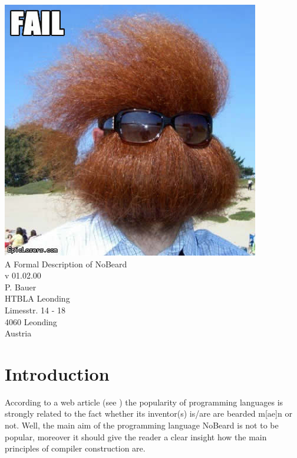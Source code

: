 \documentclass[11pt]{report}
\author{P. Bauer}
\date{V.\_01.00.00}                                           %
\newcommand{\leongage}{NoBeard}
\begin{document}
\begin{titlepage}
\begin{center}
\includegraphics[scale=0.3]{no_beard_1.jpg} \\[2em]
{\Huge A Formal Description of \leongage} \\[1em]
{\large v 01.02.00} \\[2em]
{\Large P. Bauer} \\[1em]
HTBLA Leonding \\
Limesstr. 14 - 18 \\
4060 Leonding \\
Austria
\end{center}
\end{titlepage}

\tableofcontents
\chapter{Introduction}
According to a web article (see \cite{khason_computer_2008}) the popularity of programming languages is strongly related to the fact whether its inventor(s) is/are are bearded m[ae]n or not. Well, the main aim of the programming language \leongage{} is not to be popular,
moreover it should give the reader a clear insight how the main principles of compiler construction are.
\end{document}
